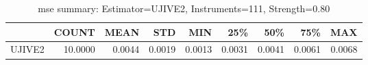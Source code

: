 \begin{table}[ht]
\centering
\caption{mse summary: Estimator=UJIVE2, Instruments=111, Strength=0.80}
\begin{tabular}{lrrrrrrrr}
\toprule
 & COUNT & MEAN & STD & MIN & 25\% & 50\% & 75\% & MAX \\
\midrule
UJIVE2 & 10.0000 & 0.0044 & 0.0019 & 0.0013 & 0.0031 & 0.0041 & 0.0061 & 0.0068 \\
\bottomrule
\end{tabular}
\end{table}

